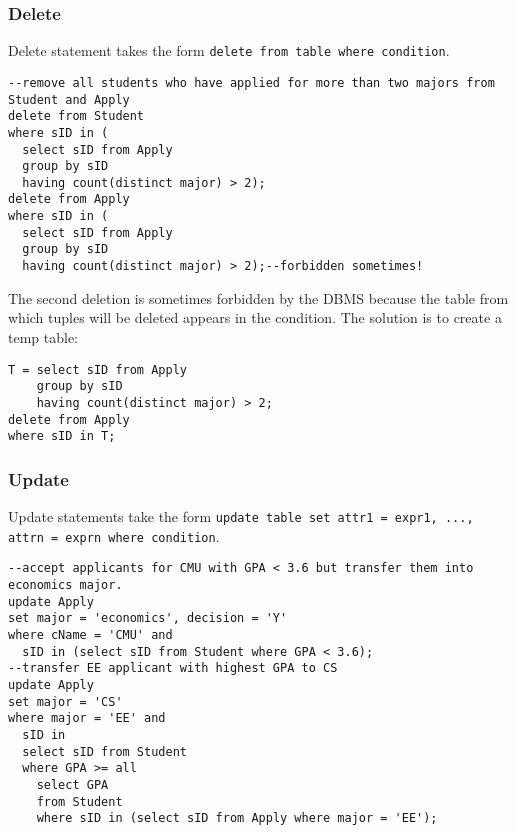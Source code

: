 \subsubsection{Delete}
Delete statement takes the form \texttt{delete from {\color{blue}table} where {\color{blue}condition}}.
\begin{lstlisting}
--remove all students who have applied for more than two majors from Student and Apply
delete from Student
where sID in (
  select sID from Apply
  group by sID
  having count(distinct major) > 2);
delete from Apply
where sID in (
  select sID from Apply
  group by sID
  having count(distinct major) > 2);--forbidden sometimes!
\end{lstlisting} 
The second deletion is sometimes forbidden by the DBMS because the table from which tuples will be deleted appears in the condition. The solution is to create a temp table:
\begin{lstlisting}
T = select sID from Apply
    group by sID
    having count(distinct major) > 2;
delete from Apply
where sID in T;
\end{lstlisting}
\subsubsection{Update}
Update statements take the form \texttt{update {\color{blue}table} set attr1 = expr1, ..., attrn = exprn where {\color{blue}condition}}.
\begin{lstlisting}
--accept applicants for CMU with GPA < 3.6 but transfer them into economics major.
update Apply
set major = 'economics', decision = 'Y'
where cName = 'CMU' and 
  sID in (select sID from Student where GPA < 3.6); 
--transfer EE applicant with highest GPA to CS
update Apply
set major = 'CS'
where major = 'EE' and
  sID in
  select sID from Student
  where GPA >= all
    select GPA 
    from Student
    where sID in (select sID from Apply where major = 'EE');
\end{lstlisting}
\ifx\PREAMBLE\undefined

\fi